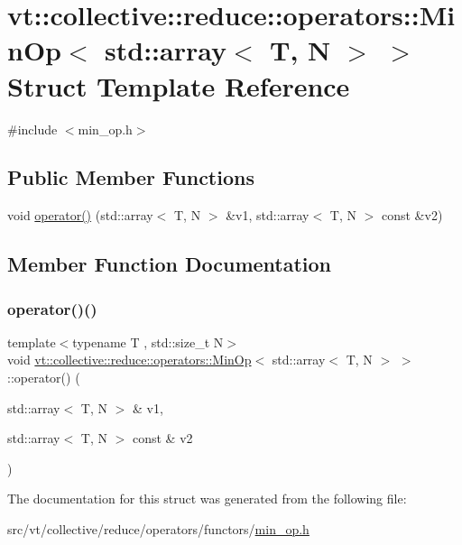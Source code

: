 \hypertarget{structvt_1_1collective_1_1reduce_1_1operators_1_1_min_op_3_01std_1_1array_3_01_t_00_01_n_01_4_01_4}{}\section{vt\+:\+:collective\+:\+:reduce\+:\+:operators\+:\+:Min\+Op$<$ std\+:\+:array$<$ T, N $>$ $>$ Struct Template Reference}
\label{structvt_1_1collective_1_1reduce_1_1operators_1_1_min_op_3_01std_1_1array_3_01_t_00_01_n_01_4_01_4}


{\ttfamily \#include $<$min\+\_\+op.\+h$>$}

\subsection*{Public Member Functions}
\begin{DoxyCompactItemize}
\item 
void \hyperlink{structvt_1_1collective_1_1reduce_1_1operators_1_1_min_op_3_01std_1_1array_3_01_t_00_01_n_01_4_01_4_a010be2bd22ef84c05e5ae414bea4de9c}{operator()} (std\+::array$<$ T, N $>$ \&v1, std\+::array$<$ T, N $>$ const \&v2)
\end{DoxyCompactItemize}


\subsection{Member Function Documentation}
\mbox{\label{structvt_1_1collective_1_1reduce_1_1operators_1_1_min_op_3_01std_1_1array_3_01_t_00_01_n_01_4_01_4_a010be2bd22ef84c05e5ae414bea4de9c}} 
\subsubsection{\texorpdfstring{operator()()}{operator()()}}
{\footnotesize\ttfamily template$<$typename T , std\+::size\+\_\+t N$>$ \\
void \hyperlink{structvt_1_1collective_1_1reduce_1_1operators_1_1_min_op}{vt\+::collective\+::reduce\+::operators\+::\+Min\+Op}$<$ std\+::array$<$ T, N $>$ $>$\+::operator() (\begin{DoxyParamCaption}\item[{std\+::array$<$ T, N $>$ \&}]{v1,  }\item[{std\+::array$<$ T, N $>$ const \&}]{v2 }\end{DoxyParamCaption})\hspace{0.3cm}{\ttfamily [inline]}}



The documentation for this struct was generated from the following file\+:\begin{DoxyCompactItemize}
\item 
src/vt/collective/reduce/operators/functors/\hyperlink{min__op_8h}{min\+\_\+op.\+h}\end{DoxyCompactItemize}
